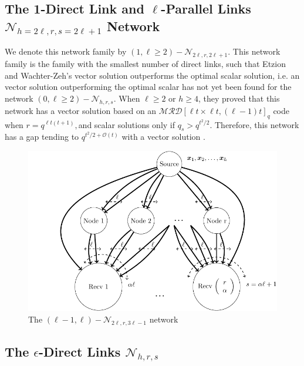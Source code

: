 \subsection{The 1-Direct Link and $\ell$-Parallel Links $\mathcal{N}_{h=2\ell,r,s=2\ell+1}$
Network}

We denote this network family by $(1,\ell\geq2)-\mathcal{N}_{2\ell,r,2\ell+1}$.
This network family is the family with the smallest number of direct
links, such that Etzion and Wachter-Zeh's vector solution outperforms
the optimal scalar solution, i.e. an vector solution outperforming
the optimal scalar has not yet been found for the network $(0,\ell\geq2)-\mathcal{N}_{h,r,s}$.
When $\ell\geq2$ or $h\geq4$, they proved that this network has
a vector solution based on an $\mathcal{MRD}\left[\ell t\times\ell t,(\ell-1)t\right]_{q}$
code when $r=q^{\ell t\left(t+1\right)},$and scalar solutions only
if $q_{s}>q^{t^{2}/2}$. Therefore, this network has a gap tending
to $q^{t^{2}/2+\mathcal{O}\left(t\right)}$ with a vector solution
.
\begin{figure}[H]
\caption{The $\left(\ell-1,\ell\right)-\mathcal{N}_{2\ell,r,3\ell-1}$ network
\label{fig:network_special2}}

\centering{}\includegraphics[width=0.45\paperwidth]{./figures/nw_special2}
\end{figure}


\subsection{The $\epsilon$-Direct Links $\mathcal{N}_{h,r,s}$}

